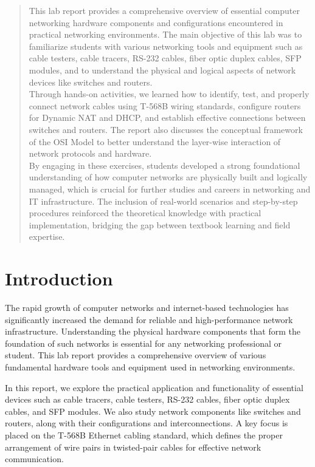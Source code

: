 \documentclass[12pt]{report}
\begin{document}
\begin{abstract}
\thispagestyle{empty}
This lab report provides a comprehensive overview of essential computer networking hardware components and configurations encountered in practical networking environments. The main objective of this lab was to familiarize students with various networking tools and equipment such as cable testers, cable tracers, RS-232 cables, fiber optic duplex cables, SFP modules, and to understand the physical and logical aspects of network devices like switches and routers.\\
Through hands-on activities, we learned how to identify, test, and properly connect network cables using T-568B wiring standards, configure routers for Dynamic NAT and DHCP, and establish effective connections between switches and routers. The report also discusses the conceptual framework of the OSI Model to better understand the layer-wise interaction of network protocols and hardware.\\
By engaging in these exercises, students developed a strong foundational understanding of how computer networks are physically built and logically managed, which is crucial for further studies and careers in networking and IT infrastructure. The inclusion of real-world scenarios and step-by-step procedures reinforced the theoretical knowledge with practical implementation, bridging the gap between textbook learning and field expertise.\\
\end{abstract}
\newpage

\tableofcontents
\thispagestyle{empty}
\clearpage
{}


\chapter{Introduction}

The rapid growth of computer networks and internet-based technologies has significantly increased the demand for reliable and high-performance network infrastructure. Understanding the physical hardware components that form the foundation of such networks is essential for any networking professional or student. This lab report provides a comprehensive overview of various fundamental hardware tools and equipment used in networking environments.

In this report, we explore the practical application and functionality of essential devices such as cable tracers, cable testers, RS-232 cables, fiber optic duplex cables, and SFP modules. We also study network components like switches and routers, along with their configurations and interconnections. A key focus is placed on the T-568B Ethernet cabling standard, which defines the proper arrangement of wire pairs in twisted-pair cables for effective network communication.
\end{document}

